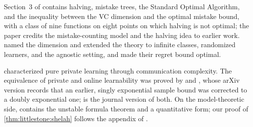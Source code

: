 \begin{refsection}
\notesandrefs

Section~3 of \textcite{Littlestone1988} contains halving, mistake trees, the Standard Optimal Algorithm, and the inequality between the VC dimension and the optimal mistake bound, with a class of nine functions on eight points on which halving is not optimal; the paper credits the mistake-counting model and the halving idea to earlier work. \Textcite{BenDavidPalShalevShwartz2009} named the dimension and extended the theory to infinite classes, randomized learners, and the agnostic setting, and \textcite{AlonEtAl2021} made their regret bound optimal.

\Textcite{FeldmanXiao2015} characterized pure private learning through communication complexity. The equivalence of private and online learnability was proved by \textcite{AlonLivniMalliarisMoran2019} and \textcite{BunLivniMoran2020}, whose arXiv version records that an earlier, singly exponential sample bound was corrected to a doubly exponential one; \textcite{AlonBunLivniMalliarisMoran2022} is the journal version of both. On the model-theoretic side, \textcite{Shelah1978} contains the unstable formula theorem and \textcite{Hodges1997} a quantitative form; our proof of \cref{thm:littlestone:shelah} follows the appendix of \textcite{AlonLivniMalliarisMoran2019}.

\printchapterbib
\end{refsection}
